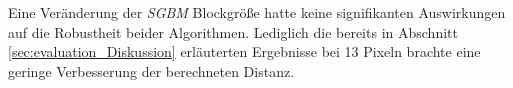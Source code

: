 \noindent
Eine Veränderung der \emph{SGBM} Blockgröße hatte keine signifikanten Auswirkungen auf die Robustheit beider Algorithmen. Lediglich die bereits in Abschnitt \ref{sec:evaluation_Diskussion} erläuterten Ergebnisse bei 13 Pixeln brachte eine geringe Verbesserung der berechneten Distanz.\\

\noindent


 



